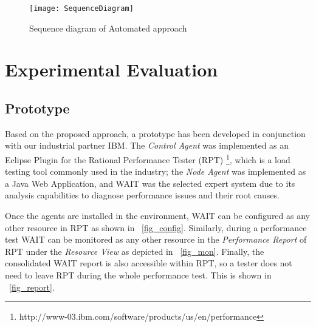 \documentclass[runningheads,a4paper]{llncs}
\begin{document}
\vspace{-5pt}
\begin{figure}[!h]
\centering
\texttt{[image: SequenceDiagram]}
\caption{Sequence diagram of Automated approach}
\label{fig_SeqDiagram}
\end{figure}
\vspace{-5pt}

\vspace{5pt}
\section{Experimental Evaluation}
\label{ExperimentalEvaluation}


\vspace{-5pt}
\subsection{Prototype}
\vspace{-5pt}
Based on the proposed approach, a prototype has been developed in
conjunction with our industrial partner IBM. The \emph{Control Agent} was
implemented as an Eclipse Plugin for the Rational Performance Tester (RPT)
\footnote{http://www-03.ibm.com/software/products/us/en/performance}, which is a
load testing tool commonly used in the industry; the \emph{Node Agent} was
implemented as a Java Web Application, and WAIT was the selected expert system
due to its analysis capabilities to diagnose performance issues and their root
causes.

Once the agents are installed in the environment, WAIT can be configured as
any other resource in RPT as shown in \figurename ~\ref{fig_config}. Similarly, during a
performance test WAIT can be monitored as any other resource in the
\emph{Performance Report} of RPT under the \emph{Resource View} as depicted in
\figurename ~\ref{fig_mon}. Finally, the consolidated WAIT report is also
accessible within RPT, so a tester does not need to leave RPT during the whole
performance test. This is shown in \figurename ~\ref{fig_report}.
\end{document}
